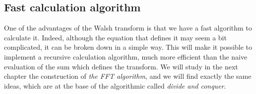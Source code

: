 \subsection{Fast calculation algorithm}
\label{sect2-fwt} 
 
 
 One of the advantages of the Walsh transform is that we have a fast algorithm to calculate it. Indeed, although the equation that defines it may seem a bit complicated, it can be broken down in a simple way. This will make it possible to implement a recursive calculation algorithm, much more efficient than the naive evaluation of the sum which defines the transform. We will study in the next chapter the construction of \textit{the FFT algorithm}, and we will find exactly the same ideas, which are at the base of the algorithmic  called \textit{divide and conquer}.
 
